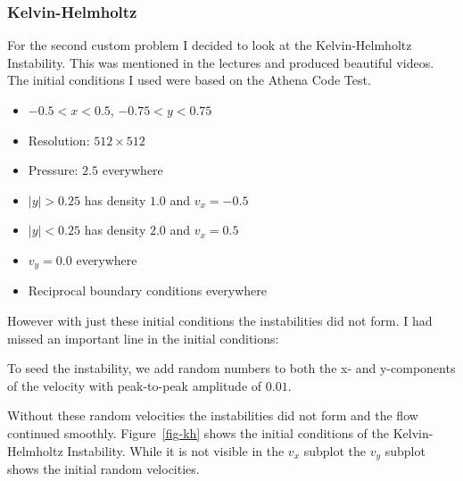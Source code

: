 \documentclass[
  letterpaper,
]{article}
\providecommand{\tightlist}{%
  \setlength{\itemsep}{0pt}\setlength{\parskip}{0pt}}
\begin{document}
\subsubsection{Kelvin-Helmholtz}\label{kelvin-helmholtz}

For the second custom problem I decided to look at the Kelvin-Helmholtz
Instability. This was mentioned in the lectures and produced beautiful
videos. The initial conditions I used were based on the Athena Code
Test.

\begin{itemize}
\tightlist
\item
  \(-0.5 < x < 0.5\), \(-0.75 < y < 0.75\)
\item
  Resolution: \(512 \times 512\)
\item
  Pressure: \(2.5\) everywhere
\item
  \(|y| > 0.25\) has density \(1.0\) and \(v_{x}=-0.5\)
\item
  \(|y| < 0.25\) has density \(2.0\) and \(v_{x}=0.5\)
\item
  \(v_{y} = 0.0\) everywhere
\item
  Reciprocal boundary conditions everywhere
\end{itemize}

However with just these initial conditions the instabilities did not
form. I had missed an important line in the initial conditions:

\begin{tcolorbox}[enhanced jigsaw, opacityback=0, left=2mm, titlerule=0mm, breakable, toprule=.15mm, coltitle=black, leftrule=.75mm, colframe=quarto-callout-note-color-frame, opacitybacktitle=0.6, bottomrule=.15mm, bottomtitle=1mm, toptitle=1mm, colbacktitle=quarto-callout-note-color!10!white, title=\textcolor{quarto-callout-note-color}{\faInfo}\hspace{0.5em}{Kelvin-Helmholtz Initial Condition}, arc=.35mm, rightrule=.15mm, colback=white]

To seed the instability, we add random numbers to both the x- and
y-components of the velocity with peak-to-peak amplitude of \(0.01\).

\end{tcolorbox}

Without these random velocities the instabilities did not form and the
flow continued smoothly. Figure~\ref{fig-kh} shows the initial
conditions of the Kelvin-Helmholtz Instability. While it is not visible
in the \(v_{x}\) subplot the \(v_{y}\) subplot shows the initial random
velocities.
\end{document}
